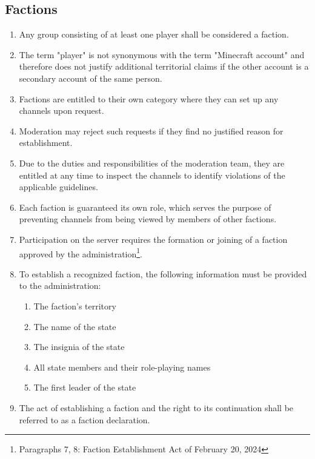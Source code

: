 \documentclass{article}
\begin{document}
\subsection{Factions}\label{factions}
\begin{enumerate}[(1)]
	\item Any group consisting of at least one player shall be considered a faction.
	\item The term "player" is not synonymous with the term "Minecraft account" and therefore does not justify additional territorial claims if the other account is a secondary account of the same person.
	\item Factions are entitled to their own category where they can set up any channels upon request.
	\item Moderation may reject such requests if they find no justified reason for establishment.
	\item Due to the duties and responsibilities of the moderation team, they are entitled at any time to inspect the channels to identify violations of the applicable guidelines.
	\item Each faction is guaranteed its own role, which serves the purpose of preventing channels from being viewed by members of other factions.
    \item Participation on the server requires the formation or joining of a faction approved by the administration\footnote{Paragraphs 7, 8: Faction Establishment Act of February 20, 2024}.
    \item To establish a recognized faction, the following information must be provided to the administration:
    \begin{enumerate}[1.]
        \item The faction's territory
        \item The name of the state
        \item The insignia of the state
        \item All state members and their role-playing names
        \item The first leader of the state
    \end{enumerate}
	\item The act of establishing a faction and the right to its continuation shall be referred to as a faction declaration.
\end{enumerate}
\end{document}

